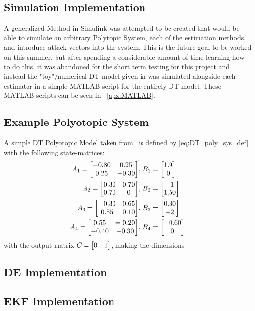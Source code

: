 \documentclass[]{ieeetran}
\begin{document}
\subsection{Simulation Implementation}
A generalized Method in Simulink was attempted to be created that would be able to simulate an arbitrary Polytopic System, each of the estimation methods, and introduce attack vectors into the system. This is the future goal to be worked on this summer, but after spending a considerable amount of time learning how to do this, it was abandoned for the short term testing for this project and instead the "toy"/numerical DT model given in \cite{beelen2017joint} was simulated alongside each estimator in a simple MATLAB script for the entirely DT model. These MATLAB scripts can be seen in \appendixname \ \ref{apx:MATLAB}.

\subsection{Example Polyotopic System}
A simple DT Polyotopic Model taken from \cite{beelen2017joint} \ is defined by \eqref{eq:DT_poly_sys_def} with the following state-matrices:
\begin{equation}
	\begin{aligned}
		A_1 = \mqty[-0.80 & 0.25\\ 0.25 & -0.30], \ &B_1 = \mqty[1.9\\0]\\
		A_2 = \mqty[0.30 & 0.70\\ 0.70 &0], \ &B_2 = \mqty[-1\\ 1.50]\\
		A_3 = \mqty[-0.30 & 0.65\\ 0.55 &0.10], \ &B_3 = \mqty[0.30\\ -2]\\
		A_4 = \mqty[0.55 & =0.20\\ -0.40 &-0.30], \ &B_4 = \mqty[-0.60\\0]
	\end{aligned}
\end{equation}
with the output matrix $C = \mqty[0 &1]$, making the dimensions 




\subsection{DE Implementation}



\subsection{EKF Implementation}
\end{document}
